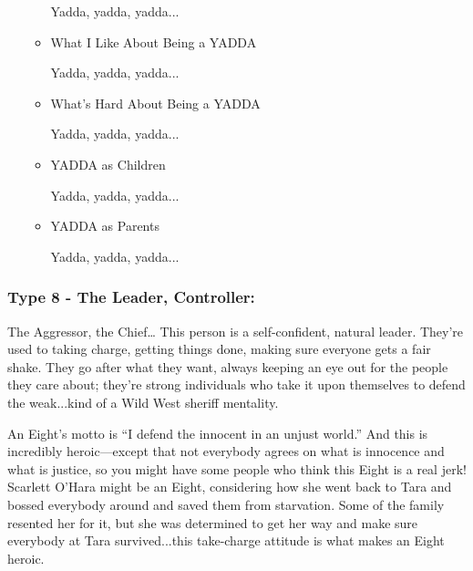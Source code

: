 \documentclass[openleft,oneside,showtrims]{memoir}
\begin{document}
\begin{itemize}
\begin{itemize}
Yadda, yadda, yadda...

\item What I Like About Being a YADDA
\label{sec:org6a83d01}

Yadda, yadda, yadda...

\item What's Hard About Being a YADDA
\label{sec:orgd091a82}

Yadda, yadda, yadda...

\item YADDA as Children
\label{sec:org0f1c589}

Yadda, yadda, yadda...

\item YADDA as Parents
\label{sec:orgeaa1a72}

Yadda, yadda, yadda...
\end{itemize}
\end{itemize}

\subsubsection*{Type 8 - The Leader, Controller:}
\label{sec:org81e5798}

The Aggressor, the Chief… This person is a self-confident, natural leader. They're used to taking charge, getting things done, making sure everyone gets a fair shake. They go after what they want, always keeping an eye out for the people they care about; they're strong individuals who take it upon themselves to defend the weak...kind of a Wild West sheriff mentality.

An Eight's motto is ``I defend the innocent in an unjust world.'' And this is incredibly heroic—except that not everybody agrees on what is innocence and what is justice, so you might have some people who think this Eight is a real jerk! Scarlett O'Hara might be an Eight, considering how she went back to Tara and bossed everybody around and saved them from starvation. Some of the family resented her for it, but she was determined to get her way and make sure everybody at Tara survived...this take-charge attitude is what makes an Eight heroic.
\end{document}
